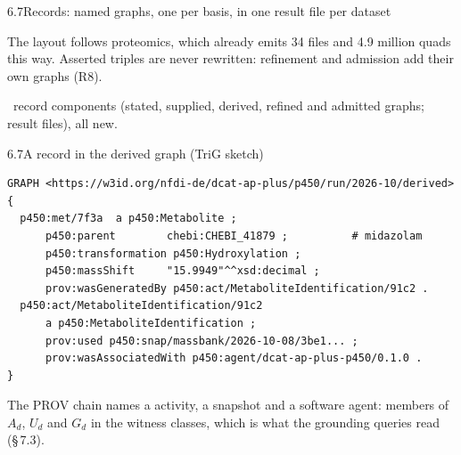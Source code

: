 \documentclass[aspectratio=169,11pt]{beamer}
\newcommand{\codesize}{\fontsize{8.7}{10.1}\selectfont}
\newcommand{\cid}[1]{\texttt{\detokenize{#1}}}
\newcommand{\src}[1]{\par\vfill{\scriptsize\color{black!60}#1\par}}
\begin{document}
\begin{frame}{6.7\quad Records: named graphs, one per basis, in one result file per dataset}
\centering
{}
\par\medskip
\raggedright\footnotesize
The layout follows proteomics, which already emits 34 files and 4.9 million quads this way.
Asserted triples are never rewritten: refinement and admission add their own graphs (R8).
\src{\NLayerRecords\ record components (stated, supplied, derived, refined and admitted graphs; result files), all new.}
\end{frame}

\begin{frame}[fragile]{6.7\quad A record in the derived graph (TriG sketch)}
\begin{Verbatim}[fontsize=\codesize]
GRAPH <https://w3id.org/nfdi-de/dcat-ap-plus/p450/run/2026-10/derived> {
  p450:met/7f3a  a p450:Metabolite ;
      p450:parent        chebi:CHEBI_41879 ;          # midazolam
      p450:transformation p450:Hydroxylation ;
      p450:massShift     "15.9949"^^xsd:decimal ;
      prov:wasGeneratedBy p450:act/MetaboliteIdentification/91c2 .
  p450:act/MetaboliteIdentification/91c2
      a p450:MetaboliteIdentification ;
      prov:used p450:snap/massbank/2026-10-08/3be1... ;
      prov:wasAssociatedWith p450:agent/dcat-ap-plus-p450/0.1.0 .
}
\end{Verbatim}
\footnotesize
The PROV chain names a \cid{MetaboliteIdentification} activity, a snapshot and a software agent: members of
$A_d$, $U_d$ and $G_d$ in the witness classes, which is what the grounding queries read (\S\,7.3).
\end{frame}
\end{document}
